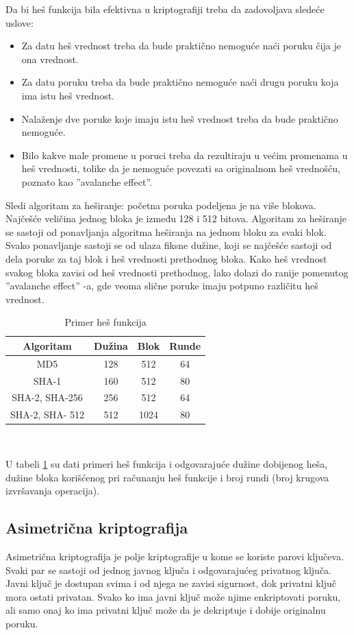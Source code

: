 \documentclass[a4paper]{article}
\begin{document}
Da bi heš funkcija bila efektivna u kriptografiji treba da zadovoljava sledeće uslove:
\begin{itemize}
\item Za datu heš vrednost treba da bude praktično nemoguće naći poruku čija je ona vrednost.
\item Za datu poruku treba da bude praktično nemoguće naći drugu poruku koja ima istu heš vrednost.
\item Nalaženje dve poruke koje imaju istu heš vrednost treba da bude praktično nemoguće. 
\item Bilo kakve male promene u poruci treba da rezultiraju u većim promenama u heš vrednosti, tolike da je nemoguće povezati sa originalnom heš vrednošću, poznato kao ''avalanche effect''.
\end{itemize}

Sledi algoritam za heširanje: početna poruka podeljena je na više blokova. Najčešće veličina jednog bloka je između 128 i 512 bitova. Algoritam za heširanje se sastoji od ponavljanja algoritma heširanja na jednom bloku za svaki blok. Svako ponavljanje sastoji se od ulaza fiksne dužine, koji se najčešće sastoji od dela poruke za taj blok i heš vrednosti prethodnog bloka. Kako heš vrednost svakog bloka zavisi od heš vrednosti prethodnog, lako dolazi do ranije pomenutog ''avalanche effect'' -a, gde veoma slične poruke imaju potpuno različitu heš vrednost.


\begin{table}[H]
\centering
 \begin{tabular}{|c| c| c| c|} 
 \hline
 Algoritam & Dužina & Blok & Runde\\ [0.5ex]
 \hline
 MD5 & 128 & 512 & 64\\ 
 \hline
 SHA-1 & 160 & 512 & 80\\ 
 \hline
 SHA-2, SHA-256 & 256 & 512 & 64\\
  \hline
 SHA-2, SHA- 512 & 512 & 1024 & 80\\
 \hline
\end{tabular}\vspace{0.5cm}\\
\caption{Primer heš funkcija}
\label{fig:hash_funkcije}
\end{table}
U tabeli \ref{fig:hash_funkcije} su dati primeri heš funkcija i odgovarajuće dužine dobijenog heša, dužine bloka korišćenog pri računanju heš funkcije i broj rundi (broj krugova izvršavanja operacija).



\subsection{Asimetrična kriptografija}
Asimetrična kriptografija je polje kriptografije u kome se koriste parovi ključeva. Svaki par se sastoji od jednog javnog ključa i odgovarajućeg privatnog ključa. Javni ključ je dostupan svima i od njega ne zavisi sigurnost, dok privatni ključ mora ostati privatan. Svako ko ima javni ključ može njime enkriptovati poruku, ali samo onaj ko ima privatni ključ može da je dekriptuje i dobije originalnu poruku. 
\end{document}
